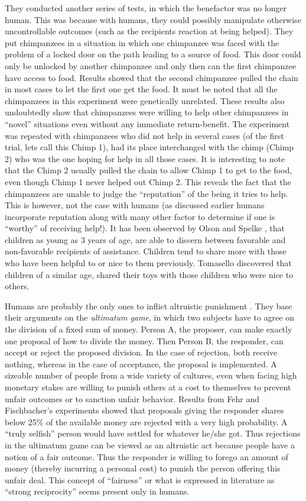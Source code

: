 \documentclass[12pt, letter]{article}
\begin{document}
They conducted another series of tests, in which the benefactor was no longer human. This was because with humans, they could possibly manipulate otherwise uncontrollable outcomes (such as the recipients reaction at being helped). They put chimpanzees in a situation in which 	one chimpanzee was faced with the problem of a locked door on the path leading to a source of food. This door could only be unlocked by another chimpanzee and only then can the first chimpanzee have access to food. Results showed that the second chimpanzee pulled the chain in most cases to let the first one get the food. It must be noted that all the chimpanzees in this experiment were genetically unrelated. These results also undoubtedly show that chimpanzees were willing to help other chimpanzees in ``novel'' situations even without any immediate return-benefit. The experiment was repeated with chimpanzees who did not help in several cases (of the first trial, lets call this Chimp 1), had its place interchanged with the chimp (Chimp 2) who was the one hoping for help in all those cases. It is interesting to note that the Chimp 2 usually pulled the chain to allow Chimp 1 to get to the food, even though Chimp 1 never helped out Chimp 2. This reveals the fact that the chimpanzees are unable to judge the ``reputation'' of the being it tries to help. This is however, not the case with humans (as discussed earlier humans incorporate reputation along with many other factor to determine if one is ``worthy'' of receiving help!). It has been observed by Olson and Spelke \cite{olson2008foundations}, that children as young as 3 years of age, are able to discern between favorable and non-favorable recipients of assistance. Children tend to share more with those who have been helpful to or nice to them previously. Tomasello \cite{tomasello2008origins} discovered that children of a similar age, shared their toys with those children who were nice to others.

Humans are probably the only ones to inflict altruistic punishment \cite{fehr2003nature}. They base their arguments on the \emph{ultimatum game}, in which two subjects have to agree on the division of a fixed sum of money. Person A, the proposer, can make exactly one proposal of how to divide the money. Then Person B, the responder, can accept or reject the proposed division. In the case of rejection, both receive nothing, whereas in the case of acceptance, the proposal is implemented. A sizeable number of people from a wide variety of cultures, even when facing high monetary stakes are willing to punish others at a cost to themselves to prevent unfair outcomes or to sanction unfair behavior. Results from Fehr and Fischbacher's experiments showed that proposals giving the responder shares below 25\% of the available money are rejected with a very high probability. A ``truly selfish'' person would have settled for whatever he/she got. Thus rejections in the ultimatum game can be viewed as an altruistic act because people have a notion of a fair outcome. Thus the responder is willing to forego an amount of money (thereby incurring a personal cost) to punish the person offering this unfair deal. This concept of ``fairness'' or what is expressed in literature as ``strong reciprocity'' seems present only in humans.
\end{document}
